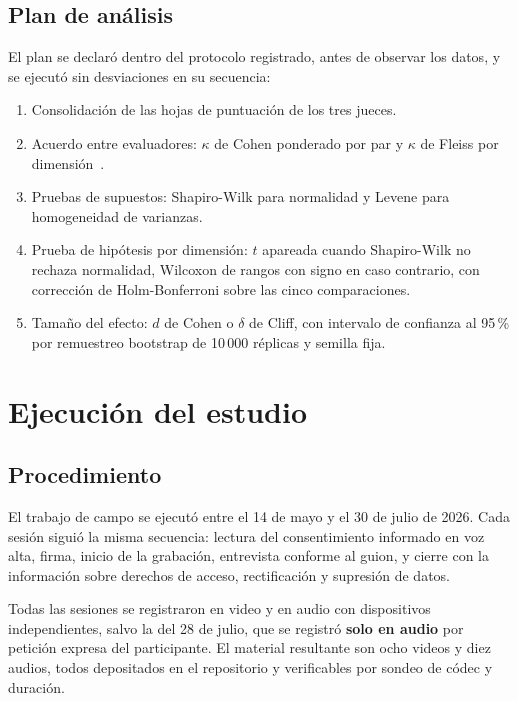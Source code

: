 \documentclass[11pt,a4paper]{article}
\begin{document}
\subsection{Plan de an\'alisis}

El plan se declar\'o dentro del protocolo registrado, antes de observar los datos, y se
ejecut\'o sin desviaciones en su secuencia:

\begin{enumerate}[leftmargin=*,nosep]
  \item Consolidaci\'on de las hojas de puntuaci\'on de los tres jueces.
  \item Acuerdo entre evaluadores: $\kappa$ de Cohen ponderado por par y $\kappa$ de
        Fleiss por dimensi\'on~\cite{cohen1960coefficient,fleiss1971measuring}.
  \item Pruebas de supuestos: Shapiro-Wilk para normalidad y Levene para homogeneidad de
        varianzas.
  \item Prueba de hip\'otesis por dimensi\'on: $t$ apareada cuando Shapiro-Wilk no
        rechaza normalidad, Wilcoxon de rangos con signo en caso contrario, con
        correcci\'on de Holm-Bonferroni sobre las cinco comparaciones.
  \item Tama\~no del efecto: $d$ de Cohen o $\delta$ de Cliff, con intervalo de
        confianza al 95\,\% por remuestreo bootstrap de 10\,000 r\'eplicas y semilla
        fija.
\end{enumerate}

\section{Ejecuci\'on del estudio}

\subsection{Procedimiento}

El trabajo de campo se ejecut\'o entre el 14 de mayo y el 30 de julio de 2026. Cada
sesi\'on sigui\'o la misma secuencia: lectura del consentimiento informado en voz alta,
firma, inicio de la grabaci\'on, entrevista conforme al guion, y cierre con la
informaci\'on sobre derechos de acceso, rectificaci\'on y supresi\'on de datos.

Todas las sesiones se registraron en video y en audio con dispositivos independientes,
salvo la del 28 de julio, que se registr\'o \textbf{solo en audio} por petici\'on
expresa del participante. El material resultante son ocho videos y diez audios, todos
depositados en el repositorio y verificables por sondeo de c\'odec y duraci\'on.
\end{document}
